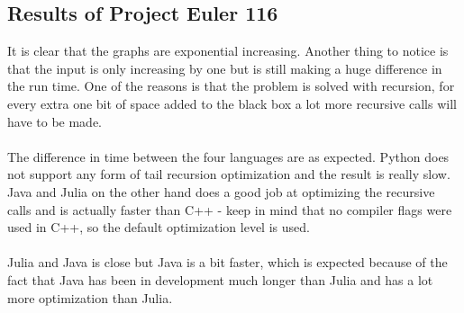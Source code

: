 \documentclass[landscape, a0]{sciposter}
\begin{document}
\begin{multicols}{3}
\begin{figure}
 \hspace*{-2.5in}
 \begin{subfigure}{0.30\textwidth}
		\centering
 \end{subfigure}
 \hspace*{2in}
 \begin{subfigure}{0.30\textwidth}
		\centering
 \end{subfigure}%
\end{figure}

\subsection{Results of Project Euler 116}
It is clear that the graphs are exponential increasing. Another thing to notice is that the input is only increasing by one but is still making a huge difference in the run time. One of the reasons is that the problem is solved with recursion, for every extra one bit of space added to the black box a lot more recursive calls will have to be made.\\
\\
The difference in time between the four languages are as expected. Python does not support any form of tail recursion optimization and the result is really slow. Java and Julia on the other hand does a good job at optimizing the recursive calls and is actually faster than C++ - keep in mind that no compiler flags were used in C++, so the default optimization level is used.\\
\\
Julia and Java is close but Java is a bit faster, which is expected because of the fact that Java has been in development much longer than Julia and has a lot more optimization than Julia.


\end{multicols}
\end{document}
